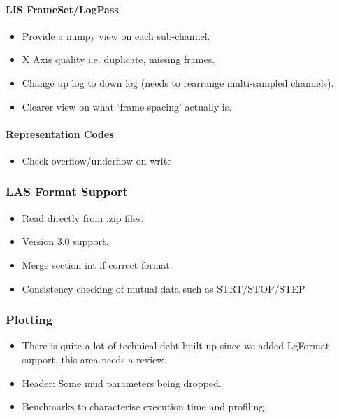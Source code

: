 \documentclass[letterpaper,10pt,english]{sphinxmanual}
\begin{document}
\paragraph{LIS FrameSet/LogPass}
\label{\detokenize{TODO:lis-frameset-logpass}}\begin{itemize}
\item {} 
Provide a numpy view on each sub-channel.

\item {} 
X Axis quality i.e. duplicate, missing frames.

\item {} 
Change up log to down log (needs to rearrange multi-sampled channels).

\item {} 
Clearer view on what ‘frame spacing’ actually is.

\end{itemize}


\paragraph{Representation Codes}
\label{\detokenize{TODO:representation-codes}}\begin{itemize}
\item {} 
Check overflow/underflow on write.

\end{itemize}


\subsubsection{LAS Format Support}
\label{\detokenize{TODO:las-format-support}}\begin{itemize}
\item {} 
Read directly from .zip files.

\item {} 
Version 3.0 support.

\item {} 
Merge  section int  if correct format.

\item {} 
Consistency checking of mutual data such as STRT/STOP/STEP

\end{itemize}


\subsubsection{Plotting}
\label{\detokenize{TODO:plotting}}\begin{itemize}
\item {} 
There is quite a lot of technical debt built up since we added LgFormat support, this area needs a review.

\item {} 
Header: Some mud parameters being dropped.

\item {} 
Benchmarks to characterise execution time and profiling.

\end{itemize}
\end{document}
